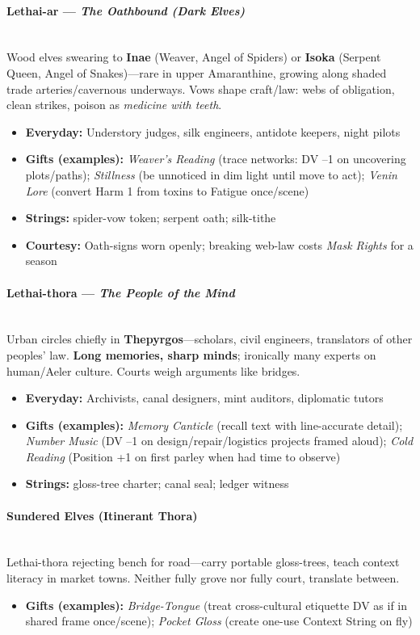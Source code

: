 \documentclass[11pt]{book}
\begin{document}
\paragraph{Lethai-ar --- \emph{The Oathbound (Dark Elves)}} \\
Wood elves swearing to \textbf{Inae} (Weaver, Angel of Spiders) or \textbf{Isoka} (Serpent Queen, Angel of Snakes)---rare in upper Amaranthine, growing along shaded trade arteries/cavernous underways. Vows shape craft/law: webs of obligation, clean strikes, poison as \emph{medicine with teeth}.
\begin{itemize}
    \item \textbf{Everyday:} Understory judges, silk engineers, antidote keepers, night pilots
    \item \textbf{Gifts (examples):} \emph{Weaver's Reading} (trace networks: DV --1 on uncovering plots/paths); \emph{Stillness} (be unnoticed in dim light until move to act); \emph{Venin Lore} (convert Harm 1 from toxins to Fatigue once/scene)
    \item \textbf{Strings:} spider-vow token; serpent oath; silk-tithe
    \item \textbf{Courtesy:} Oath-signs worn openly; breaking web-law costs \emph{Mask Rights} for a season
\end{itemize}

\paragraph{Lethai-thora --- \emph{The People of the Mind}} \\
Urban circles chiefly in \textbf{Thepyrgos}---scholars, civil engineers, translators of other peoples' law. \textbf{Long memories, sharp minds}; ironically many experts on human/Aeler culture. Courts weigh arguments like bridges.
\begin{itemize}
    \item \textbf{Everyday:} Archivists, canal designers, mint auditors, diplomatic tutors
    \item \textbf{Gifts (examples):} \emph{Memory Canticle} (recall text with line-accurate detail); \emph{Number Music} (DV --1 on design/repair/logistics projects framed aloud); \emph{Cold Reading} (Position +1 on first parley when had time to observe)
    \item \textbf{Strings:} gloss-tree charter; canal seal; ledger witness
\end{itemize}

\paragraph{Sundered Elves (Itinerant Thora)} \\
Lethai-thora rejecting bench for road---carry portable gloss-trees, teach context literacy in market towns. Neither fully grove nor fully court, translate between.
\begin{itemize}
    \item \textbf{Gifts (examples):} \emph{Bridge-Tongue} (treat cross-cultural etiquette DV as if in shared frame once/scene); \emph{Pocket Gloss} (create one-use Context String on fly)
\end{itemize}
\end{document}
